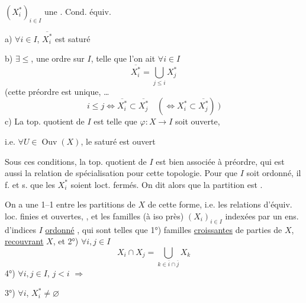 $(X_i^*)_{i\in I}$ une   
. Cond. équiv.

a) $\forall i\in I$, 
$\overline{X_i^*}$ est saturé 

b) $\exists\leq$, une  ordre sur $I$, telle que l'on ait $\forall i\in I$
\[
\overline{X_i^*}=\bigcup_{j\leq i}X_j^*
\]
(cette  préordre est unique, \ldots
\[
i\leq j\Longleftrightarrow\overline{X_i^*}\subset\overline{X_j^*}
\quad(\Longleftrightarrow X_i^*\subset\overline{X_j^*})\ )
\]
c) La top. quotient de $I$ est telle que $\varphi:X\longrightarrow I$ soit ouverte,

i.e. $\forall U\in\operatorname{Ouv}(X)$, le saturé est ouvert

Sous ces conditions, la top. quotient de $I$ est bien
associée à  préordre, qui est aussi
la relation de spécialisation pour cette topologie.
Pour que $I$ soit ordonné, il f. et s. que les
$X_i^*$ soient loct. fermés. On dit alors que la partition est
 .

On a une  1--1 entre les partitions
 de $X$ de cette forme, i.e. les relations d'équiv. loc.
finies et ouvertes, , et les familles (à iso près)
$(X_i)_{i\in I}$ indexées par un ens. d'indices $I$ \uline{ordonné}
,
qui sont telles que 1°) familles \uline{croissantes} de parties
  de $X$, \uline{recouvrant} $X$, et 2°) $\forall i,j\in I$
\[
X_i\cap X_j=\bigcup_{k\in\overline i\cap\overline j}X_k
\]
4°)  $\forall i,j\in I$, $j<i$
$\Longrightarrow$ 

3°) $\forall i$, $X_i^*\ne\varnothing$


